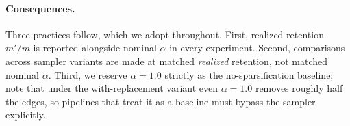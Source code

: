 

\paragraph{Consequences.}
Three practices follow, which we adopt throughout.
First, realized retention $m'/m$ is reported alongside nominal $\alpha$ in every experiment.
Second, comparisons across sampler variants are made at matched \emph{realized} retention, not matched nominal $\alpha$.
Third, we reserve $\alpha = 1.0$ strictly as the no-sparsification baseline; note that under the with-replacement variant even $\alpha = 1.0$ removes roughly half the edges, so pipelines that treat it as a baseline must bypass the sampler explicitly.
